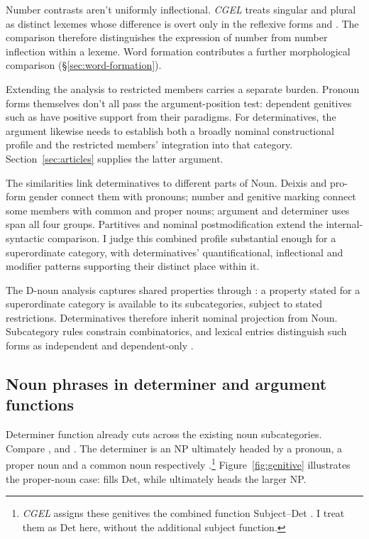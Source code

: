 \documentclass[12pt]{article}
\begin{document}
Number contrasts aren't uniformly inflectional. \textit{CGEL} treats singular and plural  as distinct lexemes whose difference is overt only in the reflexive forms  and  \citep[486]{huddleston2002}. The comparison therefore distinguishes the expression of number from number inflection within a lexeme. Word formation contributes a further morphological comparison (§\ref{sec:word-formation}).

Extending the analysis to restricted members carries a separate burden. Pronoun forms themselves don't all pass the argument-position test: dependent genitives such as  have positive support from their paradigms. For determinatives, the argument likewise needs to establish both a broadly nominal constructional profile and the restricted members' integration into that category. Section~\ref{sec:articles} supplies the latter argument.

The similarities link determinatives to different parts of Noun. Deixis and pro-form gender connect them with pronouns; number and genitive marking connect some members with common and proper nouns; argument and determiner uses span all four groups. Partitives and nominal postmodification extend the internal-syntactic comparison. I judge this combined profile substantial enough for a superordinate category, with determinatives' quantificational, inflectional and modifier patterns supporting their distinct place within it.

The D-noun analysis captures shared properties through : a property stated for a superordinate category is available to its subcategories, subject to stated restrictions. Determinatives therefore inherit nominal projection from Noun. Subcategory rules constrain combinatorics, and lexical entries distinguish such forms as independent  and dependent-only .

\subsection{Noun phrases in determiner and argument functions}\label{sec:bridge}

Determiner function already cuts across the existing noun subcategories. Compare ,  and . The determiner is an NP ultimately headed by a pronoun, a proper noun and a common noun respectively \citep[354--355, 470--471]{huddleston2002}.\footnote{\textit{CGEL} assigns these genitives the combined function Subject--Det \citep[472--473]{huddleston2002}. I treat them as Det here, without the additional subject function.} Figure~\ref{fig:genitive} illustrates the proper-noun case:  fills Det, while  ultimately heads the larger NP.
\end{document}
